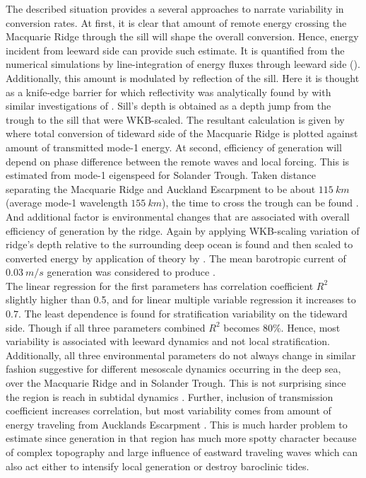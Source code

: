 \documentclass[12pt]{article}
\begin{document}
The described situation provides a several approaches to narrate variability in conversion rates. 
At first, it is clear that amount of remote energy crossing the Macquarie Ridge through the sill 
will 
shape the overall conversion. Hence, energy incident from leeward side can provide such 
estimate. It is quantified from the numerical simulations by line-integration of energy fluxes 
through leeward side (). Additionally, this amount is modulated by reflection of 
the 
sill. Here it is thought as a knife-edge barrier for which reflectivity was analytically found by  
\citep{larsen1969internal} with similar investigations of \citep{klymak2013parameterizing}.  
Sill's depth is obtained as a depth jump from the trough to the sill that were WKB-scaled. The 
resultant calculation is given by  where total conversion of tideward 
side 
of the Macquarie Ridge is plotted against amount of transmitted mode-1 energy. At second, 
efficiency 
of generation will depend on phase difference between the remote waves and local forcing. This is 
estimated from mode-1 eigenspeed for Solander Trough. Taken distance separating the Macquarie Ridge 
and Auckland Escarpment to be about $115~km$ (average mode-1 wavelength $155~km$), the time to 
cross the trough can be found . And additional factor is environmental 
changes that are associated with overall efficiency of generation by the ridge. Again by applying 
WKB-scaling variation of ridge's depth relative to the surrounding deep ocean is found and then 
scaled to converted energy by application of theory by \citep{st2003generation}. The 
mean barotropic current of $0.03~m/s$ generation was considered to produce 
.\\
The linear regression for the first parameters has correlation coefficient $R^2$ slightly higher 
than 0.5, and for linear multiple variable regression it increases to $0.7$. The least dependence 
is found for stratification variability on the tideward side. Though if all three parameters 
combined $R^2$ becomes $80\%$. Hence, most variability is associated with leeward dynamics and not 
local stratification. Additionally, all three environmental parameters do not always change in 
similar fashion suggestive for different mesoscale dynamics occurring in the deep sea, over 
the Macquarie Ridge and in Solander Trough. This is not surprising since the region is reach in 
subtidal dynamics \citep{smith2013interaction}. Further, inclusion of 
transmission coefficient increases correlation, but most variability comes from amount of energy 
traveling from Aucklands Escarpment 
. This is much harder problem to estimate since generation in that 
region has much more spotty character  because of complex topography and large 
influence of eastward traveling waves which can also act either to intensify local generation or 
destroy baroclinic tides.
\end{document}
